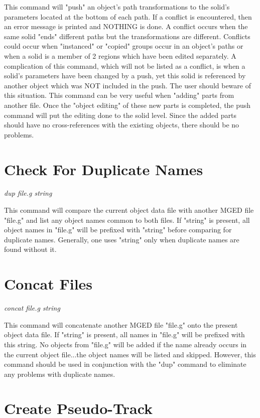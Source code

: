 This command will "push" an object's path transformations to the solid's parameters
located at the bottom of each path.
If a conflict is encountered, then an error message is printed and NOTHING is done.
A conflict occurs when the same solid "ends" different paths but the transformations
are different.
Conflicts could occur when "instanced" or "copied" groups occur in an object's
paths or when a solid is a member of 2 regions which have been edited separately.
A complication of this command, which will not be listed as a conflict, is when a solid's parameters have been
changed by a push, yet this solid is referenced by another object which was NOT
included in the push.
The user should beware of this situation.
This command can be very useful when "adding" parts from another file.
Once the "object editing" of these new parts is completed, the push command
will put the editing done to the solid level.
Since the added parts should have no cross-references with the existing
objects, there should be no problems.

\section{Check For Duplicate Names}

{\em \center
dup file.g {string}
}

This command will compare the current object data file with another
MGED file "file.g" and list any object names common to both files.
If "string" is present, all object names in "file.g" will be prefixed with
"string" before comparing for duplicate names.
Generally, one uses "string" only when duplicate names are found without it.

\section{Concat Files}

{\em \center
concat file.g {string}
}

This command will concatenate another MGED file "file.g" onto the present
object data file.
If "string" is present, all names in "file.g" will be prefixed with this
string.
No objects from "file.g" will be added if the name already occurs in the
current object file...the object names will be listed and skipped.
However, this command should be used in conjunction with the "dup" command to
eliminate any problems with duplicate names.

\section{Create Pseudo-Track}

